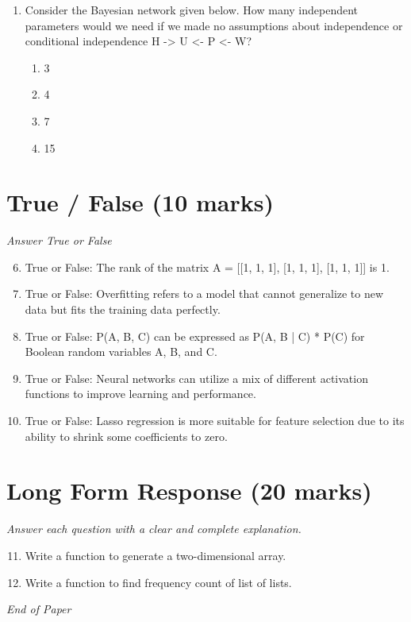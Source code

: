 \documentclass[12pt]{article}
\begin{document}
\begin{enumerate}[label=\arabic*.]
\begin{enumerate}[label=(\alph*)]
    \item True, True
    \item False, False
    \item True, False
    \item False, True
\end{enumerate}
\item Consider the Bayesian network given below. How many independent parameters would we need if we made no assumptions about independence or conditional independence H -\textgreater{} U \textless{}- P \textless{}- W?
\begin{enumerate}[label=(\alph*)]
    \item 3
    \item 4
    \item 7
    \item 15
\end{enumerate}
\end{enumerate}

\section*{True / False (10 marks)}
\textit{Answer True or False}
\begin{enumerate}[label=\arabic*.]
\setcounter{enumi}{5}
\item True or False: The rank of the matrix A = [[1, 1, 1], [1, 1, 1], [1, 1, 1]] is 1.
\item True or False: Overfitting refers to a model that cannot generalize to new data but fits the training data perfectly.
\item True or False: P(A, B, C) can be expressed as P(A, B | C) * P(C) for Boolean random variables A, B, and C.
\item True or False: Neural networks can utilize a mix of different activation functions to improve learning and performance.
\item True or False: Lasso regression is more suitable for feature selection due to its ability to shrink some coefficients to zero.
\end{enumerate}

\section*{Long Form Response (20 marks)}
\textit{Answer each question with a clear and complete explanation.}
\begin{enumerate}[label=\arabic*.]
\setcounter{enumi}{10}
\item Write a function to generate a two-dimensional array.
\item Write a function to find frequency count of list of lists.
\end{enumerate}

\vfill
\noindent\textit{End of Paper}
\end{document}
